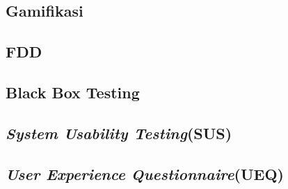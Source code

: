 \subsection{Gamifikasi}
\subsection{FDD}
\subsection{Black Box Testing}
\subsection{\textit{System Usability Testing}(SUS)}
\subsection{\textit{User Experience Questionnaire}(UEQ)}




